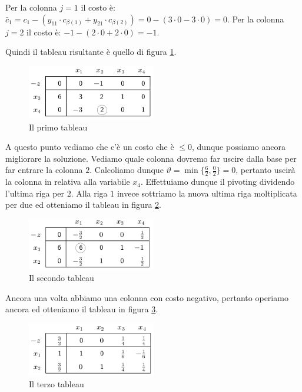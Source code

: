 \documentclass[11pt]{book}
\begin{document}
Per la colonna $j = 1$ il costo \`e: $\bar{c}_1 = c_1 - ( y_{11} \cdot
c_{\beta(1)} + y_{21} \cdot c_{\beta(2)}) = 0 - (3 \cdot 0 - 3 \cdot
0) = 0$. Per la colonna $j = 2$ il costo \`e: $-1 - (2 \cdot 0 + 2
\cdot 0) = -1$.

Quindi il tableau risultante \`e quello di figura \ref{cap6tab1}.

\begin{figure}[h!]
  \centering
  \includegraphics[width=0.5\textwidth]{images/cap6tab1.png}
  \caption{Il primo tableau}
  \label{cap6tab1}
\end{figure}

A questo punto vediamo che c'\`e un costo che \`e $\leq 0$, dunque
possiamo ancora migliorare la soluzione. Vediamo quale colonna dovremo
far uscire dalla base per far entrare la colonna $2$. Calcoliamo
dunque $\vartheta = \min\bigr\{\frac{6}{2}, \frac{0}{2} \bigr\} = 0$,
pertanto uscir\`a la colonna in relativa alla variabile
$x_4$. Effettuiamo dunque il pivoting dividendo l'ultima riga per
$2$. Alla riga $1$ invece sottriamo la nuova ultima riga moltiplicata
per due ed otteniamo il tableau in figura \ref{cap6tab2}.

\begin{figure}[h!]
  \centering
  \includegraphics[width=0.5\textwidth]{images/cap6tab2.png}
  \caption{Il secondo tableau}
  \label{cap6tab2}
\end{figure}

Ancora una volta abbiamo una colonna con costo negativo, pertanto
operiamo ancora ed otteniamo il tableau in figura \ref{cap6tab3}.

\begin{figure}[h!]
  \centering
  \includegraphics[width=0.5\textwidth]{images/cap6tab3.png}
  \caption{Il terzo tableau}
  \label{cap6tab3}
\end{figure}
\end{document}
